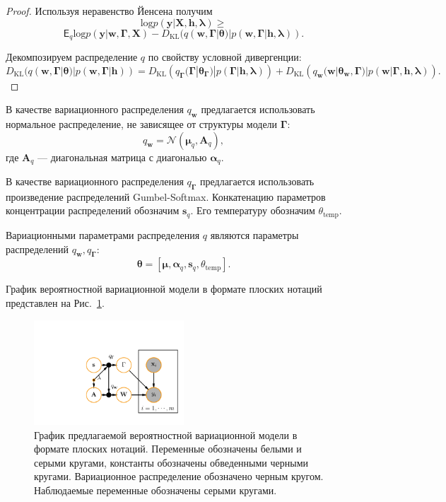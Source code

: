 \begin{proof}
Используя неравенство Йенсена получим 
\[
\text{log} p(\mathbf{y}|\mathbf{X}, \mathbf{h}, \boldsymbol{\lambda}) \geq
\]
\[
   \mathsf{E}_{q} \text{log}p(\mathbf{y}|\mathbf{w}, \boldsymbol{\Gamma}, \mathbf{X}) - D_\text{KL}(q (\mathbf{w},\boldsymbol{\Gamma}|\boldsymbol{\theta})|p(\mathbf{w},\boldsymbol{\Gamma}|\mathbf{h}, \boldsymbol{\lambda})).
\]

Декомпозируем распределение $q$ по свойству условной дивергенции:
\[
D_\text{KL}(q (\mathbf{w},\boldsymbol{\Gamma}|\boldsymbol{\theta})|p(\mathbf{w},\boldsymbol{\Gamma}|\mathbf{h})) = D_\text{KL}\left(q_{\boldsymbol{\Gamma}}(\boldsymbol{\Gamma}|\boldsymbol{\theta}_{\boldsymbol{\Gamma}})|p(\boldsymbol{\Gamma}|\mathbf{h}, \boldsymbol{\lambda})\right) + D_\text{KL}\left(q_{\mathbf{w}}(\mathbf{w}|\boldsymbol{\theta}_\mathbf{w},\boldsymbol{\Gamma})|p(\mathbf{w}|\boldsymbol{\Gamma}, \mathbf{h}, \boldsymbol{\lambda})\right).    
\]
\end{proof}

В качестве вариационного распределения $q_{\mathbf{w}}$ предлагается использовать нормальное распределение, не зависящее от структуры модели $\boldsymbol{\Gamma}$:
\[
    q_{\mathbf{w}} = \mathcal{N}(\boldsymbol{\mu}_q, \mathbf{A}_q), 
\]
где $\mathbf{A}_q$ --- диагональная матрица с диагональю $\boldsymbol{\alpha}_q$.

В качестве вариационного распределения $q_{\boldsymbol{\Gamma}}$ предлагается использовать произведение распределений Gumbel-Softmax. Конкатенацию параметров концентрации распределений обозначим $\mathbf{s}_q$. Его температуру обозначим $\theta_\text{temp}$.

Вариационными параметрами распределения $q$ являются параметры распределений $q_{\mathbf{w}}, q_{\boldsymbol{\Gamma}}$:
\[
    \boldsymbol{\theta} = [\boldsymbol{\mu}, \boldsymbol{\alpha}_q, \mathbf{s}_q, \theta_\text{temp}]. 
\]


График вероятностной вариационной модели в формате плоских нотаций представлен на Рис.~\ref{fig:plate_qprob}.
\begin{figure}
\centering
   \includegraphics[width=0.5\textwidth]{plots/notebooks/plate.pdf}
\caption{График предлагаемой вероятностной вариационной модели в формате плоских нотаций. Переменные обозначены белыми и серыми кругами, константы обозначены обведенными черными кругами. Вариационное распределение обозначено черным кругом. Наблюдаемые переменные обозначены серыми кругами.}
\label{fig:plate_qprob}
\end{figure}

